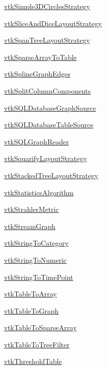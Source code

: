 \begin{DoxyItemize}
\item \hyperlink{vtkinfovis_vtksimple3dcirclesstrategy}{vtk\-Simple3\-D\-Circles\-Strategy}  
\item \hyperlink{vtkinfovis_vtksliceanddicelayoutstrategy}{vtk\-Slice\-And\-Dice\-Layout\-Strategy}  
\item \hyperlink{vtkinfovis_vtkspantreelayoutstrategy}{vtk\-Span\-Tree\-Layout\-Strategy}  
\item \hyperlink{vtkinfovis_vtksparsearraytotable}{vtk\-Sparse\-Array\-To\-Table}  
\item \hyperlink{vtkinfovis_vtksplinegraphedges}{vtk\-Spline\-Graph\-Edges}  
\item \hyperlink{vtkinfovis_vtksplitcolumncomponents}{vtk\-Split\-Column\-Components}  
\item \hyperlink{vtkinfovis_vtksqldatabasegraphsource}{vtk\-S\-Q\-L\-Database\-Graph\-Source}  
\item \hyperlink{vtkinfovis_vtksqldatabasetablesource}{vtk\-S\-Q\-L\-Database\-Table\-Source}  
\item \hyperlink{vtkinfovis_vtksqlgraphreader}{vtk\-S\-Q\-L\-Graph\-Reader}  
\item \hyperlink{vtkinfovis_vtksquarifylayoutstrategy}{vtk\-Squarify\-Layout\-Strategy}  
\item \hyperlink{vtkinfovis_vtkstackedtreelayoutstrategy}{vtk\-Stacked\-Tree\-Layout\-Strategy}  
\item \hyperlink{vtkinfovis_vtkstatisticsalgorithm}{vtk\-Statistics\-Algorithm}  
\item \hyperlink{vtkinfovis_vtkstrahlermetric}{vtk\-Strahler\-Metric}  
\item \hyperlink{vtkinfovis_vtkstreamgraph}{vtk\-Stream\-Graph}  
\item \hyperlink{vtkinfovis_vtkstringtocategory}{vtk\-String\-To\-Category}  
\item \hyperlink{vtkinfovis_vtkstringtonumeric}{vtk\-String\-To\-Numeric}  
\item \hyperlink{vtkinfovis_vtkstringtotimepoint}{vtk\-String\-To\-Time\-Point}  
\item \hyperlink{vtkinfovis_vtktabletoarray}{vtk\-Table\-To\-Array}  
\item \hyperlink{vtkinfovis_vtktabletograph}{vtk\-Table\-To\-Graph}  
\item \hyperlink{vtkinfovis_vtktabletosparsearray}{vtk\-Table\-To\-Sparse\-Array}  
\item \hyperlink{vtkinfovis_vtktabletotreefilter}{vtk\-Table\-To\-Tree\-Filter}  
\item \hyperlink{vtkinfovis_vtkthresholdtable}{vtk\-Threshold\-Table}  

\end{DoxyItemize}
